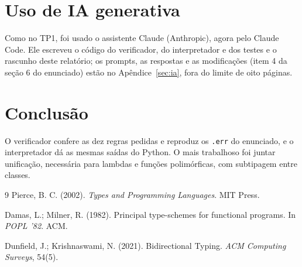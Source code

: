 \documentclass[12pt,a4paper]{article}
\begin{document}
\section{Uso de IA generativa}

Como no TP1, foi usado o assistente Claude (Anthropic), agora pelo
Claude Code. Ele escreveu o código do verificador, do interpretador e
dos testes e o rascunho deste relatório; os prompts, as respostas e as
modificações (item 4 da seção 6 do enunciado) estão no
Apêndice~\ref{sec:ia}, fora do limite de oito páginas.

\section{Conclusão}

O verificador confere as dez regras pedidas e reproduz os
\texttt{.err} do enunciado, e o interpretador dá as mesmas saídas do
Python. O mais trabalhoso foi juntar unificação, necessária para
lambdas e funções polimórficas, com subtipagem entre classes.

\begin{thebibliography}{9}
\setlength{\itemsep}{0pt}
Pierce, B. C. (2002). \emph{Types and Programming Languages}. MIT Press.

Damas, L.; Milner, R. (1982). Principal type-schemes for functional programs. In \emph{POPL '82}. ACM.

Dunfield, J.; Krishnaswami, N. (2021). Bidirectional Typing. \emph{ACM Computing Surveys}, 54(5).
\end{thebibliography}

\clearpage
\appendix

\end{document}
